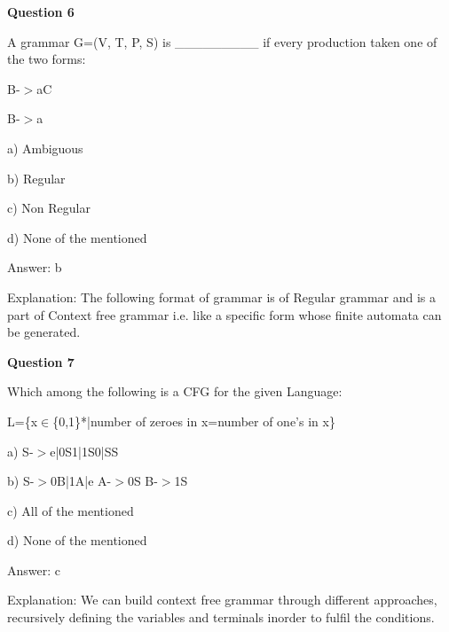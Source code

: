 \documentclass{article}
\begin{document}
\begin{mdframed}[linewidth=1pt, roundcorner=5pt, linecolor=gray!30, backgroundcolor=gray!5]
\textbf{Question 6} 

A grammar G=(V, T, P, S) is \_\_\_\_\_\_\_\_\_ if every production taken one of the two forms:

B-$>$aC

B-$>$a

a) Ambiguous

b) Regular

c) Non Regular

d) None of the mentioned
\vspace{5pt} \par
\begin{tcolorbox}[colback=green!5, colframe=green!40!black, title=Solution]
Answer: b

Explanation: The following format of grammar is of Regular grammar and is a part of Context free grammar i.e. like a specific form whose finite automata can be generated.
\end{tcolorbox}
\end{mdframed}

\begin{mdframed}[linewidth=1pt, roundcorner=5pt, linecolor=gray!30, backgroundcolor=gray!5]
\textbf{Question 7} 

Which among the following is a CFG for the given Language:

L=\{x$\in$\{0,1\}*|number of zeroes in x=number of one's in x\}

a) S-$>$e|0S1|1S0|SS

b) S-$>$0B|1A|e  A-$>$0S  B-$>$1S

c) All of the mentioned

d) None of the mentioned
\vspace{5pt} \par
\begin{tcolorbox}[colback=green!5, colframe=green!40!black, title=Solution]
Answer: c

Explanation: We can build context free grammar through different approaches, recursively defining the variables and terminals inorder to fulfil the conditions.
\end{tcolorbox}
\end{mdframed}
\end{document}
